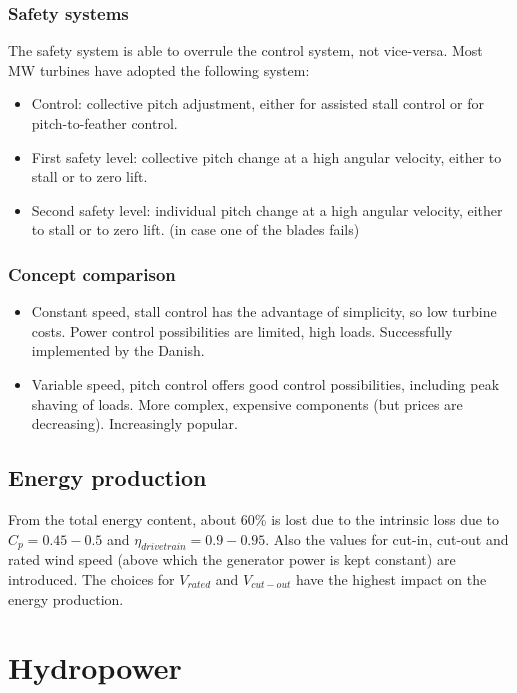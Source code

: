 \documentclass[a4paper,10pt]{article}
\begin{document}
\subsubsection{Safety systems}
The safety system is able to overrule the control system, not vice-versa. Most MW turbines have adopted the following system:
\begin{itemize}
 \item Control: collective pitch adjustment, either for assisted stall control or for pitch-to-feather control.
 \item First safety level: collective pitch change at a high angular velocity, either to stall or to zero lift.
 \item Second safety level: individual pitch change at a high angular velocity, either to stall or to zero lift. (in case one of the blades fails)
\end{itemize}


\subsubsection{Concept comparison}
\begin{itemize}
 \item Constant speed, stall control has the advantage of simplicity, so low turbine costs. Power control possibilities are limited, high loads. Successfully implemented by the Danish.
 \item Variable speed, pitch control offers good control possibilities, including peak shaving of loads. More complex, expensive components (but prices are decreasing). Increasingly popular. 
\end{itemize}



\subsection{Energy production}
From the total energy content, about 60\% is lost due to the intrinsic loss due to $C_p = 0.45-0.5$ and $\eta_{drivetrain} = 0.9-0.95$. Also the values for cut-in, cut-out and rated wind speed (above which the generator power is kept constant) are introduced. The choices for $V_{rated}$ and $V_{cut-out}$ have the highest impact on the energy production. 



\section{Hydropower}
\end{document}
